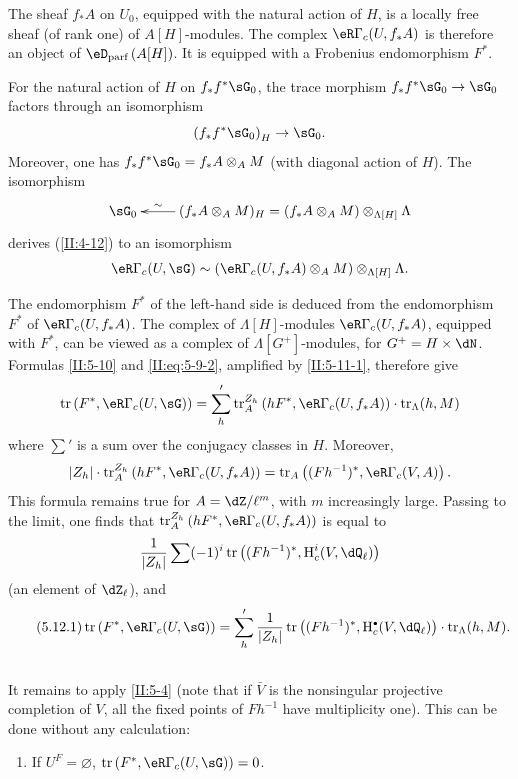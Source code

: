The sheaf $f_* A$ on $U_0$, equipped with the natural action of $H$, is a
locally free sheaf (of rank one) of $A[H]$-modules. The complex
$\eR\Gamma_c(U,f_* A)$ is therefore an object of
$\eD_\text{parf}\left(A[H]\right)$. It is equipped with a Frobenius
endomorphism $F^*$.

For the natural action of $H$ on $f_* f^*\sG_0$, the trace morphism
$f_* f^*\sG_0\to\sG_0$ factors through an isomorphism
\[
  \left(f_* f^*\sG_0\right)_H \to \sG_0 \text{.}
\]
Moreover, one has $f_* f^*\sG_0=f_* A\otimes_A M$ (with diagonal action of
$H$). The isomorphism
\[\xymatrix{
  \sG_0
    & \ar[l]_-\sim (f_* A\otimes_A M)_H = (f_* A\otimes_A M)\otimes_{\Lambda[H]} \Lambda
}\]
derives (\ref{II:4-12}) to an isomorphism
\[
  \eR\Gamma_c(U,\sG) \sim \left(\eR\Gamma_c(U,f_* A)\otimes_A M\right)\otimes_{\Lambda[H]} \Lambda \text{.}
\]

The endomorphism $F^*$ of the left-hand side is deduced from the
endomorphism $F^*$ of $\eR\Gamma_c(U,f_* A)$. The complex of
$\Lambda[H]$-modules $\eR\Gamma_c(U,f_* A)$, equipped with $F^*$, can be
viewed as a complex of $\Lambda[G^+]$-modules, for $G^+=H\times \dN$.
Formulas \ref{II:5-10} and \eqref{II:eq:5-9-2}, amplified by
\ref{II:5-11-1}, therefore give
\[
  \tr\left(F^*,\eR\Gamma_c(U,\sG)\right) = \sum_h' \tr_A^{Z_h}\left(h F^*,\eR\Gamma_c(U,f_* A)\right)\cdot \tr_\Lambda(h,M)
\]
where $\sum'$ is a sum over the conjugacy classes in $H$. Moreover,
\[
  |Z_h|\cdot \tr_A^{Z_h}\left(h F^*,\eR\Gamma_c(U,f_* A)\right) = \tr_A\left((F h^{-1})^*,\eR\Gamma_c(V,A)\right) \text{.}
\]
This formula remains true for $A=\dZ/\ell^m$, with $m$ increasingly large.
Passing to the limit, one finds that
$\tr_A^{Z_h}\left(h F^*,\eR\Gamma_c(U,f_* A)\right)$ is equal to
\[
  \frac{1}{|Z_h|} \sum (-1)^i \tr\left((F h^{-1})^*,\h_c^i(V,\dQ_\ell)\right)
\]
(an element of $\dZ_\ell$), and
\begin{equation*}\tag{5.12.1}\label{II:eq:5-12-1}
\tr\left(F^*,\eR\Gamma_c(U,\sG)\right) = \sum_h' \frac{1}{|Z_h|} \tr\left((F h^{-1})^*,\h_c^\bullet(V,\dQ_\ell)\right)\cdot \tr_\Lambda(h,M) \text{.}
\end{equation*}






\subsection{}\label{II:5-13}

It remains to apply \ref{II:5-4} (note that if $\bar V$ is the nonsingular
projective completion of $V$, all the fixed points of $F h^{-1}$ have
multiplicity one). This can be done without any calculation:
\begin{enumerate}[\indent A.]
  \item If $U^F=\varnothing$,
    $\tr\left(F^*,\eR\Gamma_c(U,\sG)\right) = 0$. \end{enumerate}

